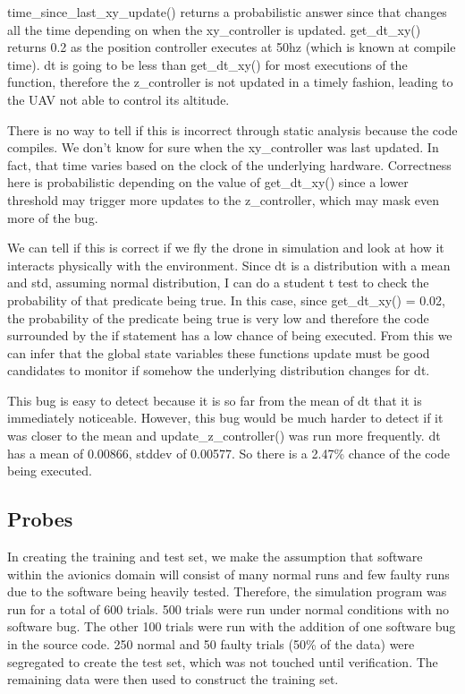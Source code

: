 

time\_since\_last\_xy\_update() returns a probabilistic answer since that
changes all the time depending on when the xy\_controller is
updated. get\_dt\_xy() returns 0.2 as the position controller executes
at 50hz (which is known at compile time). dt is going to be less than
get\_dt\_xy() for most executions of the function, therefore the
z\_controller is not updated in a timely fashion, leading to the UAV
not able to control its altitude.

There is no way to tell if this is incorrect through static analysis
because the code compiles. We don't know for sure when the
xy\_controller was last updated. In fact, that time varies based on the
clock of the underlying hardware. Correctness here is probabilistic
depending on the value of get\_dt\_xy() since a lower threshold may
trigger more updates to the z\_controller, which may mask even more of
the bug.

We can tell if this is correct if we fly the drone in simulation and
look at how it interacts physically with the environment. Since dt is
a distribution with a mean and std, assuming normal distribution, I
can do a student t test to check the probability of that predicate
being true. In this case, since get\_dt\_xy() = 0.02, the probability of
the predicate being true is very low and therefore the code surrounded
by the if statement has a low chance of being executed. From this we
can infer that the global state variables these functions update must
be good candidates to monitor if somehow the underlying distribution
changes for dt.

This bug is easy to detect because it is so far from the mean of dt
that it is immediately noticeable. However, this bug would be much
harder to detect if it was closer to the mean and
update\_z\_controller() was run more frequently. dt has a mean of
0.00866, stddev of 0.00577. So there is a 2.47\% chance of the code
being executed.

\subsection{Probes}

In creating the training and test set, we make the assumption that
software within the avionics domain will consist of many normal runs
and few faulty runs due to the software being heavily
tested. Therefore, the simulation program was run for a total of 600
trials. 500 trials were run under normal conditions with no software
bug. The other 100 trials were run with the addition of one software
bug in the source code. 250 normal and 50 faulty trials (50\% of the
data) were segregated to create the test set, which was not touched
until verification. The remaining data were then used to construct the
training set.

